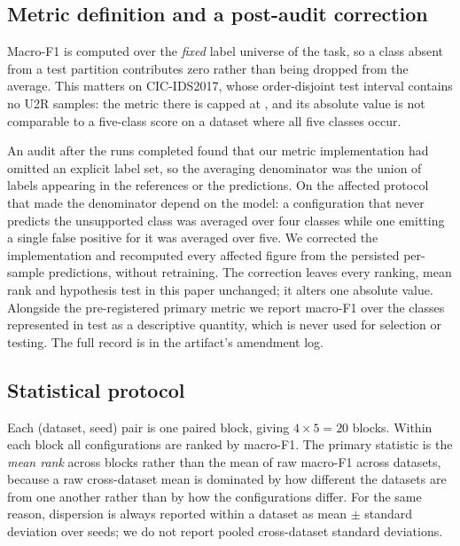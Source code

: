 \subsection{Metric definition and a post-audit correction}

Macro-F1 is computed over the \emph{fixed} label universe of the task, so a
class absent from a test partition contributes zero rather than being dropped
from the average. This matters on CIC-IDS2017, whose order-disjoint test
interval contains no U2R samples: the metric there is capped at
\FNCicCeiling{}, and its absolute value is not comparable to a five-class score
on a dataset where all five classes occur.

An audit after the runs completed found that our metric implementation had
omitted an explicit label set, so the averaging denominator was the union of
labels appearing in the references or the predictions. On the affected protocol
that made the denominator depend on the model: a configuration that never
predicts the unsupported class was averaged over four classes while one emitting
a single false positive for it was averaged over five. We corrected the
implementation and recomputed every affected figure from the persisted
per-sample predictions, without retraining. The correction leaves every ranking,
mean rank and hypothesis test in this paper unchanged; it alters one absolute
value. Alongside the pre-registered primary metric we report macro-F1 over the
classes represented in test as a descriptive quantity, which is never used for
selection or testing. The full record is in the artifact's amendment log.

\subsection{Statistical protocol}

Each (dataset, seed) pair is one paired block, giving $4\times5=20$ blocks.
Within each block all configurations are ranked by macro-F1. The primary
statistic is the \emph{mean rank} across blocks rather than the mean of raw
macro-F1 across datasets, because a raw cross-dataset mean is dominated by how
different the datasets are from one another rather than by how the
configurations differ. For the same reason, dispersion is always reported within
a dataset as mean $\pm$ standard deviation over seeds; we do not report pooled
cross-dataset standard deviations.

